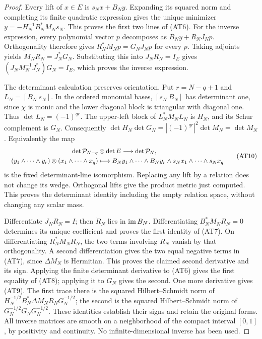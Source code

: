 \begin{proof}
Every lift of $x\in E$ is $s_Nx+B_Ny$. Expanding its squared norm
and completing its finite quadratic expression gives the unique
minimizer $y=-H_N^{-1}B_N^*M_Ns_N$. This proves the first two
lines of (AT6). For the inverse expression, every polynomial vector
$p$ decomposes as $B_Ny+R_NJ_Np$. Orthogonality therefore gives
$R_N^*M_Np=G_NJ_Np$ for every $p$. Taking adjoints yields
$M_NR_N=J_N^*G_N$. Substituting this into $J_NR_N=I_E$ gives
$(J_NM_N^{-1}J_N^*)G_N=I_E$, which proves the inverse expression.

The determinant calculation preserves orientation. Put
$r=N-q+1$ and $L_N=[B_N\ s_N]$. In the ordered monomial bases,
$[s_N\ B_N]$ has determinant one, since $\chi$ is monic and the
lower diagonal block is triangular with diagonal one. Thus
$\det L_N=(-1)^{qr}$. The upper-left block of $L_N^*M_NL_N$
is $H_N$, and its Schur complement is $G_N$. Consequently
$\det H_N\det G_N=|(-1)^{qr}|^2\det M_N=\det M_N$.
Equivalently the map
\[
 \begin{gathered}
 \det\mathcal P_{N-q}\otimes\det E\longrightarrow\det\mathcal P_N,\\
 \quad (y_1\wedge\cdots\wedge y_r)\otimes(x_1\wedge\cdots\wedge x_q)
 \longmapsto
 B_Ny_1\wedge\cdots\wedge B_Ny_r\wedge s_Nx_1\wedge\cdots\wedge s_Nx_q
 \end{gathered}
                                                        \tag{AT10}
\]
is the fixed determinant-line isomorphism. Replacing any lift by a
relation does not change its wedge. Orthogonal lifts give the product
metric just computed. This proves the determinant identity including
the empty relation space, without changing any scalar mass.

Differentiate $J_NR_N=I$; then $\dot R_N$ lies in $\operatorname{im} B_N$.
Differentiating $B_N^*M_NR_N=0$ determines its unique coefficient
and proves the first identity of (AT7). On differentiating
$R_N^*M_NR_N$, the two terms involving $\dot R_N$ vanish by
that orthogonality. A second differentiation gives the two equal
negative terms in (AT7), since $\Delta M_N$ is Hermitian. This
proves the claimed second derivative and its sign. Applying the
finite determinant derivative to (AT6) gives the first equality
of (AT8); applying it to $G_N$ gives the second.
One more derivative gives (AT9). The first trace there is the squared
Hilbert--Schmidt norm of
$H_N^{-1/2}B_N^*\Delta M_NR_NG_N^{-1/2}$; the second is the
squared Hilbert--Schmidt norm of
$G_N^{-1/2}\dot G_NG_N^{-1/2}$. These identities establish their
signs and retain the original forms. All inverse matrices are smooth
on a neighborhood of the compact interval $[0,1]$, by positivity
and continuity. No infinite-dimensional inverse has been used.
\end{proof}

